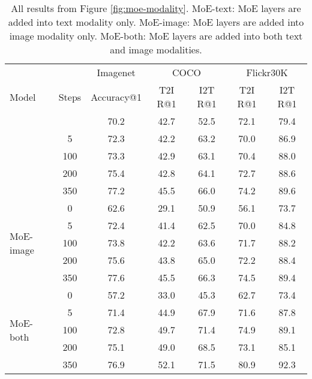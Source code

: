 \begin{table*}[h]
\caption{All results from Figure \ref{fig:moe-modality}. MoE-text: MoE layers are added into text modality only. MoE-image: MoE layers are added into image modality only. MoE-both: MoE layers are added into both text and image modalities.}
\label{tab:appendix-modality}
\vskip 0.15in
\begin{center}
\begin{small}
\begin{sc}
\begin{tabular}{lcccccc}
\toprule
\multirow{3}{*}{Model} &\multirow{3}{*}{Steps} &\multicolumn{1}{c}{Imagenet} &\multicolumn{2}{c}{COCO} &\multicolumn{2}{c}{Flickr30K} \\
& &Accuracy@1 &T2I R@1 &I2T R@1 &T2I R@1 &I2T R@1 \\

\midrule
\multirow{5}{*}{MoE-text} 
&0 &70.2 &42.7 &52.5 &72.1 &79.4 \rule{0pt}{3ex} \\
&5 & 72.3 &42.2 &63.2 &70.0 &86.9 \rule{0pt}{3ex} \\
&100 & 73.3 &42.9 &63.1 &70.4 &88.0 \rule{0pt}{3ex} \\
&200 & 75.4 &42.8 &64.1 &72.7 &88.6 \rule{0pt}{3ex} \\
&350 & 77.2 &45.5 &66.0 &74.2 &89.6 \rule{0pt}{3ex} \\
\midrule
\multirow{5}{*}{MoE-image} &0 &62.6 &29.1 &50.9 &56.1 &73.7 \rule{0pt}{3ex} \\
&5 & 72.4 &41.4 &62.5 &70.0 &84.8 \rule{0pt}{3ex} \\
&100 & 73.8 &42.2 &63.6 &71.7 &88.2 \rule{0pt}{3ex} \\
&200 & 75.6 &43.8 &65.0 &72.2 &88.4 \rule{0pt}{3ex} \\
&350 & 77.6 &45.5 &66.3 &74.5 &89.4 \rule{0pt}{3ex} \\

\midrule
\multirow{5}{*}{MoE-both} &0 &57.2 &33.0 &45.3 &62.7 &73.4 \rule{0pt}{3ex} \\
&5 & 71.4 &44.9 &67.9 &71.6 &87.8 \rule{0pt}{3ex} \\
&100 & 72.8 &49.7 &71.4 &74.9 &89.1 \rule{0pt}{3ex} \\
&200 & 75.1 &49.0 &68.5 &73.1 &85.1 \rule{0pt}{3ex} \\
&350 & 76.9 &52.1 &71.5 &80.9 &92.3 \rule{0pt}{3ex} \\

\bottomrule
\end{tabular}
\end{sc}
\end{small}
\end{center}
\end{table*}